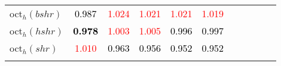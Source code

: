 \begin{tabular}[t]{l|>{}cccc>{}c|ccccc}
oct$_h(bshr)$ & \textcolor{black}{0.987} & \textcolor{red}{1.024} & \textcolor{red}{1.021} & \textcolor{red}{1.021} & \textcolor{red}{1.019} &  &  &  &  & \\
oct$_h(hshr)$ & \textcolor{black}{\textbf{0.978}} & \textcolor{red}{1.003} & \textcolor{red}{1.005} & \textcolor{black}{0.996} & \textcolor{black}{0.997} &  &  &  &  & \\
oct$_h(shr)$ & \textcolor{red}{1.010} & \textcolor{black}{0.963} & \textcolor{black}{0.956} & \textcolor{black}{0.952} & \textcolor{black}{0.952} &  &  &  &  & \\
\bottomrule
{}\\
\end{tabular}

